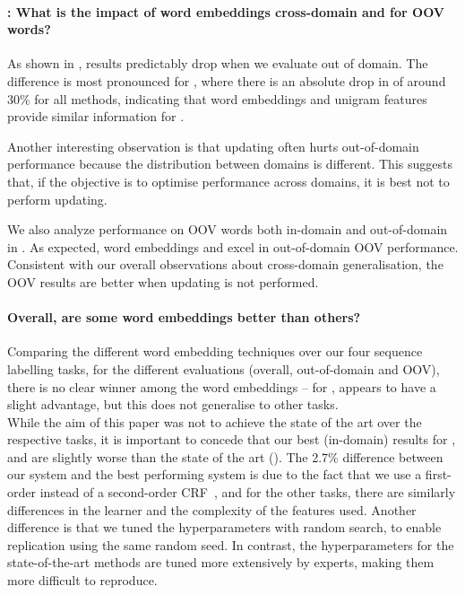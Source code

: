\paragraph{\RQ[4]: What is the impact of word embeddings cross-domain
  and for OOV words?}
As shown in , results predictably drop when we
evaluate out of domain.
The difference is most pronounced for \chunking, where there is an
absolute drop in \fscore of around 30\% for all methods, indicating that
word embeddings and unigram features provide similar information for
\chunking. 

Another interesting observation is that updating often hurts
out-of-domain performance because the distribution between domains is different. 
This suggests that, if the objective is to optimise performance across
domains, it is best not to perform updating. 

We also analyze performance on OOV words both in-domain and
out-of-domain in .
As expected, word embeddings and \brown excel in out-of-domain OOV performance.
Consistent with our overall observations about cross-domain
generalisation, the OOV results are better when updating is not performed. 

\paragraph{\RQ[5] Overall, are some word embeddings better than others?}
Comparing the different word embedding techniques over our four sequence
labelling tasks, for the different evaluations (overall, out-of-domain
and OOV), there is no clear winner among the word embeddings -- for
\pos, \Skipgram appears to have a slight advantage, but this does not
generalise to other tasks.\\

While the aim of this paper was not to achieve the state of the art over
the respective tasks, it is important to concede that our best
(in-domain) results for \ner, \pos and \chunking are
slightly worse than the state of the art
(). The 2.7\% difference between our \ner system and
the best performing system is due to the fact that we use a first-order
instead of a second-order CRF~\cite{Ando:2005}, and for the other tasks,
there are similarly differences in the learner and the complexity of the
features used.
Another difference is that we tuned the hyperparameters with random
search, to enable replication using the same random seed.
In contrast, the hyperparameters for the state-of-the-art methods are
tuned more extensively by experts, making them more difficult to reproduce.









